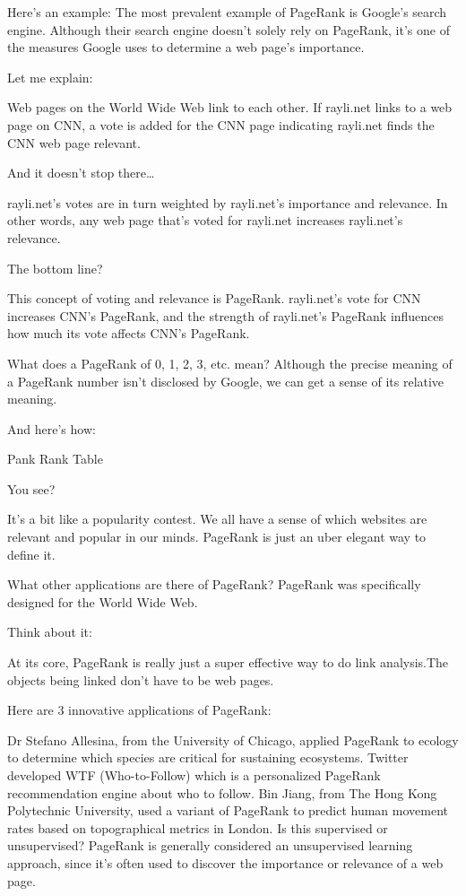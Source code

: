 Here’s an example: The most prevalent example of PageRank is Google’s search engine. Although their search engine doesn’t solely rely on PageRank, it’s one of the measures Google uses to determine a web page’s importance.

Let me explain:

Web pages on the World Wide Web link to each other. If rayli.net links to a web page on CNN, a vote is added for the CNN page indicating rayli.net finds the CNN web page relevant.

And it doesn’t stop there…

rayli.net’s votes are in turn weighted by rayli.net’s importance and relevance. In other words, any web page that’s voted for rayli.net increases rayli.net’s relevance.

The bottom line?

This concept of voting and relevance is PageRank. rayli.net’s vote for CNN increases CNN’s PageRank, and the strength of rayli.net’s PageRank influences how much its vote affects CNN’s PageRank.

What does a PageRank of 0, 1, 2, 3, etc. mean? Although the precise meaning of a PageRank number isn’t disclosed by Google, we can get a sense of its relative meaning.

And here’s how:

Pank Rank Table

You see?

It’s a bit like a popularity contest. We all have a sense of which websites are relevant and popular in our minds. PageRank is just an uber elegant way to define it.

What other applications are there of PageRank? PageRank was specifically designed for the World Wide Web.

Think about it:

At its core, PageRank is really just a super effective way to do link analysis.The objects being linked don’t have to be web pages.

Here are 3 innovative applications of PageRank:

Dr Stefano Allesina, from the University of Chicago, applied PageRank to ecology to determine which species are critical for sustaining ecosystems.
Twitter developed WTF (Who-to-Follow) which is a personalized PageRank recommendation engine about who to follow.
Bin Jiang, from The Hong Kong Polytechnic University, used a variant of PageRank to predict human movement rates based on topographical metrics in London.
Is this supervised or unsupervised? PageRank is generally considered an unsupervised learning approach, since it’s often used to discover the importance or relevance of a web page.

